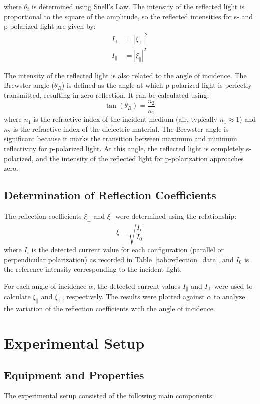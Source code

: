 \documentclass[journal]{IEEEtran}
\begin{document}
where $\theta_t$ is determined using Snell's Law. The intensity of the reflected light is proportional to the square of the amplitude, so the reflected intensities for s- and p-polarized light are given by:
\begin{align}
    I_{\perp} &= \left| \xi_{\perp} \right|^2 \\
    I_{\parallel} &= \left| \xi_{\parallel} \right|^2
\end{align}

The intensity of the reflected light is also related to the angle of incidence. The Brewster angle ($\theta_B$) is defined as the angle at which p-polarized light is perfectly transmitted, resulting in zero reflection. It can be calculated using:
\begin{equation}
    \tan(\theta_B) = \frac{n_2}{n_1}
\end{equation}
where $n_1$ is the refractive index of the incident medium (air, typically $n_1 \approx 1$) and $n_2$ is the refractive index of the dielectric material.
The Brewster angle is significant because it marks the transition between maximum and minimum reflectivity for p-polarized light. At this angle, the reflected light is completely s-polarized, and the intensity of the reflected light for p-polarization approaches zero.

\subsection{Determination of Reflection Coefficients}
The reflection coefficients $\xi_{\perp}$ and $\xi_{\parallel}$ were determined using the relationship:
\begin{equation}
    \xi = \sqrt{\frac{I_i}{I_0}}
\end{equation}
where $I_i$ is the detected current value for each configuration (parallel or perpendicular polarization) as recorded in Table~\ref{tab:reflection_data}, and $I_0$ is the reference intensity corresponding to the incident light.

For each angle of incidence $\alpha$, the detected current values $I_{\parallel}$ and $I_{\perp}$ were used to calculate $\xi_{\parallel}$ and $\xi_{\perp}$, respectively. The results were plotted against $\alpha$ to analyze the variation of the reflection coefficients with the angle of incidence.
\section{Experimental Setup}
\subsection{Equipment and Properties}
The experimental setup consisted of the following main components:
\end{document}
